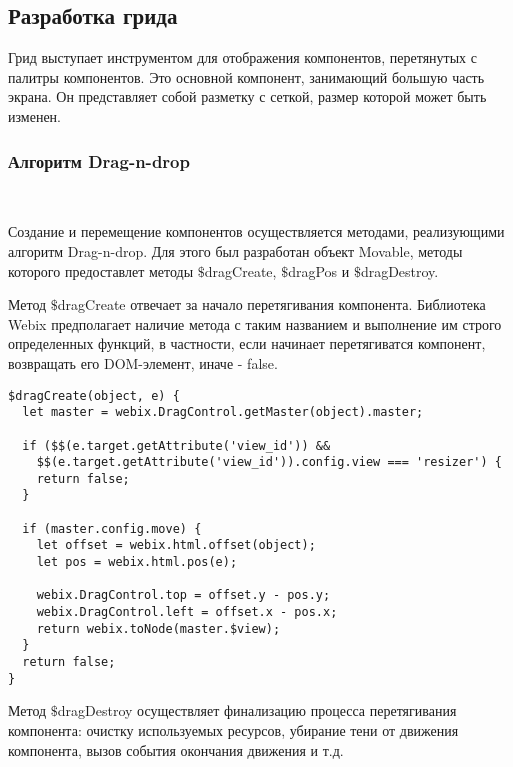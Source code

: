 \subsection{Разработка грида}
\label{sec:development:grid}

Грид выступает инструментом для отображения компонентов, перетянутых с палитры компонентов. Это основной компонент, занимающий большую часть экрана. Он представляет собой разметку с сеткой, размер которой может быть изменен.

\subsubsection{Алгоритм Drag-n-drop}
\

Создание и перемещение компонентов осуществляется методами, реализующими алгоритм Drag-n-drop. Для этого был разработан объект Movable, методы которого предоставлет методы $\$$dragCreate, $\$$dragPos и $\$$dragDestroy.

Метод $\$$dragCreate отвечает за начало перетягивания компонента. Библиотека Webix предполагает наличие метода с таким названием и выполнение им строго определенных функций, в частности, если начинает перетягиватся компонент, возвращать его DOM-элемент, иначе - false.

\begin{lstlisting}
$dragCreate(object, e) {
  let master = webix.DragControl.getMaster(object).master;

  if ($$(e.target.getAttribute('view_id')) &&
    $$(e.target.getAttribute('view_id')).config.view === 'resizer') {
    return false;
  }

  if (master.config.move) {
    let offset = webix.html.offset(object);
    let pos = webix.html.pos(e);

    webix.DragControl.top = offset.y - pos.y;
    webix.DragControl.left = offset.x - pos.x;
    return webix.toNode(master.$view);
  }
  return false;
}
\end{lstlisting}

Метод $\$$dragDestroy осуществляет финализацию процесса перетягивания компонента: очистку используемых ресурсов, убирание тени от движения компонента, вызов события окончания движения и т.д.

